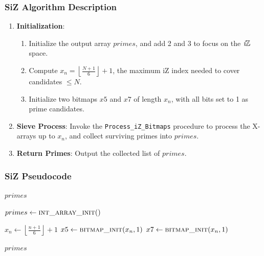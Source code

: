 \documentclass{article}
\begin{document}
\subsubsection*{SiZ Algorithm Description}
\begin{enumerate}
    \item \textbf{Initialization}:
    \begin{enumerate}
        \item Initialize the output array $primes$, and add 2 and 3 to focus on the $\textit{i}\mathbb{Z}$ space.
        \item Compute $x_n = \left\lfloor\tfrac{N+1}{6}\right\rfloor + 1$, the maximum iZ index needed to cover candidates $\le N$.
        \item Initialize two bitmaps $x5$ and $x7$ of length $x_n$, with all bits set to 1 as prime candidates.
    \end{enumerate}
    \item \textbf{Sieve Process}: Invoke the \texttt{Process\_iZ\_Bitmaps} procedure to process the X-arrays up to $x_n$, and collect surviving primes into $primes$.
    \item \textbf{Return Primes}: Output the collected list of $primes$.
\end{enumerate}

\subsubsection*{SiZ Pseudocode}
\begin{algorithm}[H]
    \caption{SiZ — Sieve-iZ}
    \begin{algorithmic}[1]
         
        \Ensure $primes$ 
                    
        \State {}
        \State {} $primes \gets \Call{int\_array\_init}$  
        \State {}
        \State {}

        \State $x_n \gets \left\lfloor\tfrac{n+1}{6}\right\rfloor + 1$ 
        \State {} $x5 \gets \Call{bitmap\_init}{x_n, 1}$ 
        \State {} $x7 \gets \Call{bitmap\_init}{x_n, 1}$ 
        
        \State {}
        \State {} 

        \State \Return $primes$ 
    \end{algorithmic}
\end{algorithm}
\end{document}
